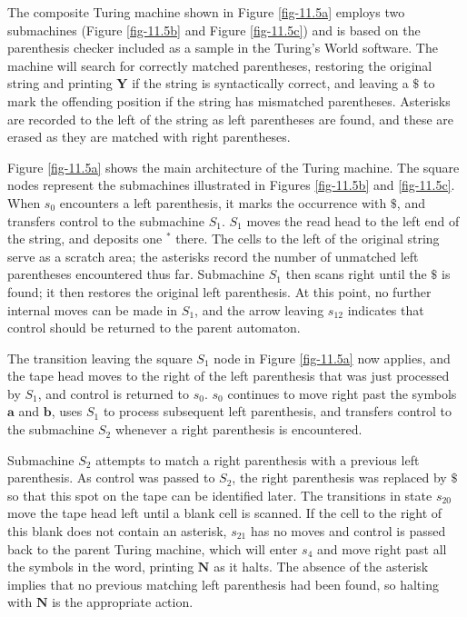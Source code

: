The composite Turing machine shown in Figure \ref{fig-11.5a} employs two submachines (Figure \ref{fig-11.5b} and Figure \ref{fig-11.5c})
and is based on the parenthesis checker included as a sample in the Turing's
World software. The machine will search for correctly matched parentheses,
restoring the original string and printing $\pmb{Y}$ if the string is
syntactically correct, and leaving a $\pmb{\$}$ to mark the offending position if the
string has mismatched parentheses. Asterisks are recorded to the left of the
string as left parentheses are found, and these are erased as they are matched
with right parentheses.

Figure \ref{fig-11.5a} shows the main architecture of the Turing machine. The square nodes
represent the submachines illustrated in Figures \ref{fig-11.5b} and \ref{fig-11.5c}. When $s_0$
encounters a left parenthesis, it marks the occurrence with $\pmb{\$}$, and
transfers control to the submachine $S_1$. $S_1$ moves the read head to the left
end of the string, and deposits one $\pmb{^*}$ there. The cells to the left of the
original string serve as a scratch area; the asterisks record the number of
unmatched left parentheses encountered thus far. Submachine $S_1$ then scans
right until the $\pmb{\$}$ is found; it then restores the original left
parenthesis. At this point, no further internal moves can be made in $S_1$, and
the arrow leaving $s_{12}$ indicates that control should be returned to the
parent automaton.

The transition leaving the square $S_1$ node in Figure \ref{fig-11.5a} now applies, and
the tape head moves to the right of the left parenthesis that was just processed
by $S_1$, and control is returned to $s_0$. $s_0$ continues to move right past
the symbols $\pmb{a}$ and $\pmb{b}$, uses $S_1$ to process subsequent left
parenthesis, and transfers control to the submachine $S_2$ whenever a right
parenthesis is encountered.

Submachine $S_2$ attempts to match a right parenthesis with a previous left
parenthesis. As control was passed to $S_2$, the right parenthesis was replaced
by $\pmb{\$}$ so that this spot on the tape can be identified later. The
transitions in state $s_{20}$ move the tape head left until a blank cell is
scanned. If the cell to the right of this blank does not contain an asterisk,
$s_{21}$ has no moves and control is passed back to the parent Turing machine,
which will enter $s_4$ and move right past all the symbols in the word, printing
$\pmb{N}$ as it halts. The absence of the asterisk implies that no previous
matching left parenthesis had been found, so halting with $\pmb{N}$ is the
appropriate action.

